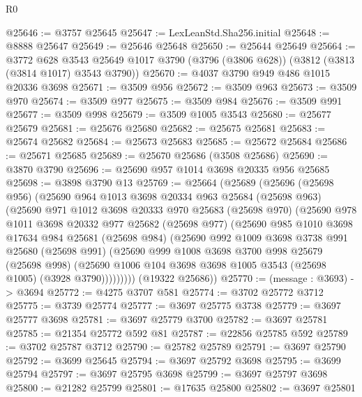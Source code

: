 \begin{lexlean}{R0}
\begin{coremodule}
@25646 := @3757 @25645
@25647 := LexLeanStd.Sha256.initial
@25648 := @8888 @25647
@25649 := @25646 @25648
@25650 := @25644 @25649
@25664 := @3772
    @628
    @3543
    @25649
    @1017
    @3790
    (@3796 (@3806 @628))
    (@3812 (@3813 (@3814 @1017) @3543 @3790))
@25670 := @4037 @3790 @949 @486 @1015 @20336 @3698
@25671 := @3509 @956
@25672 := @3509 @963
@25673 := @3509 @970
@25674 := @3509 @977
@25675 := @3509 @984
@25676 := @3509 @991
@25677 := @3509 @998
@25679 := @3509 @1005 @3543
@25680 := @25677 @25679
@25681 := @25676 @25680
@25682 := @25675 @25681
@25683 := @25674 @25682
@25684 := @25673 @25683
@25685 := @25672 @25684
@25686 := @25671 @25685
@25689 := @25670 @25686 (@3508 @25686)
@25690 := @3870 @3790
@25696 := @25690 @957 @1014 @3698 @20335 @956 @25685
@25698 := @3898 @3790 @13
@25769 := @25664
    (@25689
      (@25696
        (@25698 @956)
        (@25690
          @964
          @1013
          @3698
          @20334
          @963
          @25684
          (@25698 @963)
          (@25690
            @971
            @1012
            @3698
            @20333
            @970
            @25683
            (@25698 @970)
            (@25690
              @978
              @1011
              @3698
              @20332
              @977
              @25682
              (@25698 @977)
              (@25690
                @985
                @1010
                @3698
                @17634
                @984
                @25681
                (@25698 @984)
                (@25690
                  @992
                  @1009
                  @3698
                  @3738
                  @991
                  @25680
                  (@25698 @991)
                  (@25690
                    @999
                    @1008
                    @3698
                    @3700
                    @998
                    @25679
                    (@25698 @998)
                    (@25690 @1006 @104 @3698 @3698 @1005 @3543 (@25698 @1005) (@3928 @3790)))))))))
      (@19322 @25686))
@25770 := (message : @3693) -> @3694
@25772 := @4275 @3707 @581
@25774 := @3702 @25772 @3712
@25775 := @3739 @25774
@25777 := @3697 @25775 @3738
@25779 := @3697 @25777 @3698
@25781 := @3697 @25779 @3700
@25782 := @3697 @25781
@25785 := @21354 @25772 @592 @81
@25787 := @22856 @25785 @592
@25789 := @3702 @25787 @3712
@25790 := @25782 @25789
@25791 := @3697 @25790
@25792 := @3699 @25645
@25794 := @3697 @25792 @3698
@25795 := @3699 @25794
@25797 := @3697 @25795 @3698
@25799 := @3697 @25797 @3698
@25800 := @21282 @25799
@25801 := @17635 @25800
@25802 := @3697 @25801

\end{coremodule}
\end{lexlean}

